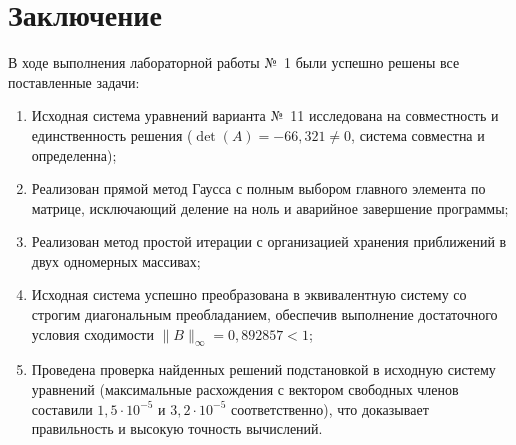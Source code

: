 \section{Заключение}

В ходе выполнения лабораторной работы №~1 были успешно решены все поставленные задачи:
\begin{enumerate}
    \item Исходная система уравнений варианта №~11 исследована на совместность и единственность решения ($\det(A) = -66{,}321 \neq 0$, система совместна и определенна);
    \item Реализован прямой метод Гаусса с полным выбором главного элемента по матрице, исключающий деление на ноль и аварийное завершение программы;
    \item Реализован метод простой итерации с организацией хранения приближений в двух одномерных массивах;
    \item Исходная система успешно преобразована в эквивалентную систему со строгим диагональным преобладанием, обеспечив выполнение достаточного условия сходимости $\|B\|_\infty = 0{,}892857 < 1$;
    \item Проведена проверка найденных решений подстановкой в исходную систему уравнений (максимальные расхождения с вектором свободных членов составили $1{,}5 \cdot 10^{-5}$ и $3{,}2 \cdot 10^{-5}$ соответственно), что доказывает правильность и высокую точность вычислений.
\end{enumerate}

